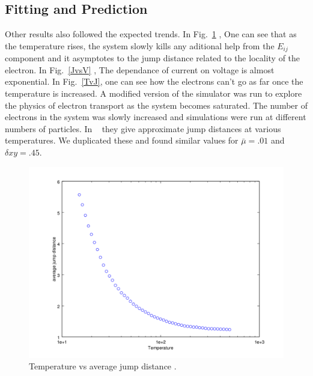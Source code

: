 \subsection{Fitting and Prediction}
  Other results also followed the expected trends. In Fig.~\ref{TvsRbar} , One can see that as the temperature rises, the system slowly kills any aditional help from the $E_{ij}$ component and it asymptotes to the jump distance related to the locality of the electron. In Fig.~\ref{JvsV} , The dependance of current on voltage is almost exponential. In Fig.~\ref{TvJ}, one can see how the electrons can't go as far once the temperature is increased. A modified version of the simulator was run to explore the physics of electron transport as the system becomes saturated. The number of electrons in the system was slowly increased and simulations were run at different numbers of particles. In ~\cite{Beloborodov07} they give approximate jump distances at various temperatures. We duplicated these and found similar values for $\bar \mu = .01$ and $\delta xy = .45$.

\begin{figure}[htbp]
\begin{center}
\includegraphics[scale=.50]{TvRGreat.png}
\caption{Temperature vs average jump distance .}
\label{TvsRbar}
\end{center}
\end{figure}


